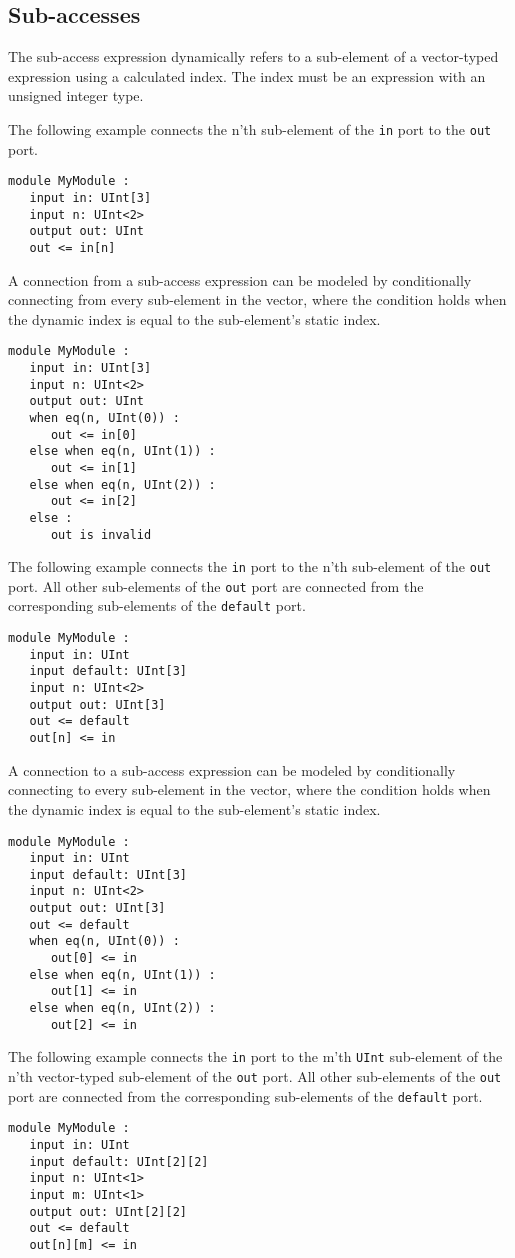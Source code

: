 \documentclass[12pt]{article}
\begin{document}
\subsection{Sub-accesses}
The sub-access expression dynamically refers to a sub-element of a vector-typed expression using a calculated index. The index must be an expression with an unsigned integer type.

The following example connects the n'th sub-element of the \verb|in| port to the \verb|out| port.
\begin{lstlisting}
module MyModule :
   input in: UInt[3]
   input n: UInt<2>
   output out: UInt
   out <= in[n]
\end{lstlisting}

A connection from a sub-access expression can be modeled by conditionally connecting from every sub-element in the vector, where the condition holds when the dynamic index is equal to the sub-element's static index.
\begin{lstlisting}
module MyModule :
   input in: UInt[3]
   input n: UInt<2>
   output out: UInt
   when eq(n, UInt(0)) :
      out <= in[0]
   else when eq(n, UInt(1)) :
      out <= in[1]
   else when eq(n, UInt(2)) :
      out <= in[2]
   else :
      out is invalid
\end{lstlisting}

The following example connects the \verb|in| port to the n'th sub-element of the \verb|out| port. All other sub-elements of the \verb|out| port are connected from the corresponding sub-elements of the \verb|default| port.
\begin{lstlisting}
module MyModule :
   input in: UInt
   input default: UInt[3]
   input n: UInt<2>
   output out: UInt[3]
   out <= default
   out[n] <= in
\end{lstlisting}

A connection to a sub-access expression can be modeled by conditionally connecting to every sub-element in the vector, where the condition holds when the dynamic index is equal to the sub-element's static index.
\begin{lstlisting}
module MyModule :
   input in: UInt
   input default: UInt[3]
   input n: UInt<2>
   output out: UInt[3]
   out <= default
   when eq(n, UInt(0)) :
      out[0] <= in
   else when eq(n, UInt(1)) :
      out[1] <= in
   else when eq(n, UInt(2)) :
      out[2] <= in
\end{lstlisting}

The following example connects the \verb|in| port to the m'th \verb|UInt| sub-element of the n'th vector-typed sub-element of the \verb|out| port. All other sub-elements of the \verb|out| port are connected from the corresponding sub-elements of the \verb|default| port.
\begin{lstlisting}
module MyModule :
   input in: UInt
   input default: UInt[2][2]
   input n: UInt<1>
   input m: UInt<1>
   output out: UInt[2][2]
   out <= default
   out[n][m] <= in
\end{lstlisting}
\end{document}
